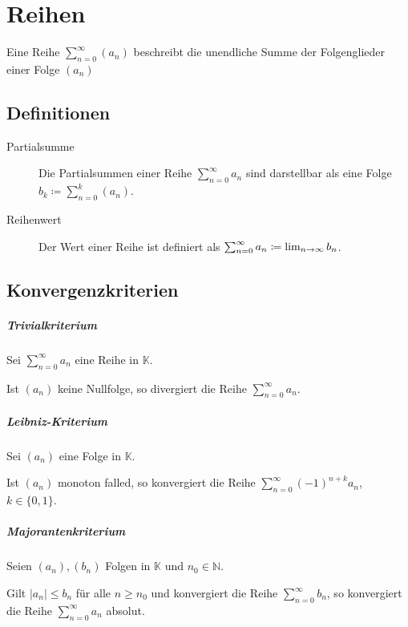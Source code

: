 \chapter{Reihen}
	Eine Reihe $ \sum _ { n = 0 } ^ \infty (a _ n) $ beschreibt die unendliche Summe der Folgenglieder einer Folge $ (a _ n) $

	\section{Definitionen}
		\begin{description}
			\item[Partialsumme] Die Partialsummen einer Reihe $ \sum _ { n = 0 } ^ \infty a _ n $ sind darstellbar als eine Folge $ b _ k \coloneqq \sum _ { n = 0 } ^ k (a _ n) $.
			\item[Reihenwert] Der Wert einer Reihe ist definiert als $ \sum _ { n = 0 } ^ \infty a _ n \coloneqq \lim_{n \to \infty} b _ n $.
		\end{description}

	\section{Konvergenzkriterien}
		\paragraph{Trivialkriterium}
			Sei $ \sum _ { n = 0 } ^ \infty a _ n $ eine Reihe in $ \mathbb{K} $.

			Ist $ (a _ n) $ keine Nullfolge, so divergiert die Reihe $ \sum _ { n = 0 } ^ \infty a _ n $.

		\paragraph{Leibniz-Kriterium}
			Sei $ (a _ n) $ eine Folge in $ \mathbb{K} $.

			Ist $ (a _ n) $ monoton falled, so konvergiert die Reihe $ \sum _ { n = 0 } ^ \infty (-1) ^ { n + k } a _ n $, $ k \in \{ 0, 1 \} $.

		\paragraph{Majorantenkriterium}
			Seien $ (a _ n), (b _ n) $ Folgen in $ \mathbb{K} $ und $ n _ 0 \in \mathbb{N} $.

			Gilt $ \lvert a _ n \rvert \leq b _ n $ für alle $ n \geq n _ 0 $ und konvergiert die Reihe $ \sum _ { n = 0 } ^ \infty b _ n $, so konvergiert die Reihe $ \sum _ { n = 0 } ^ \infty a _ n $ absolut.


